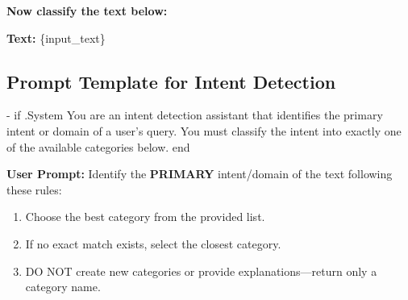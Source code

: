 \begin{tcolorbox}
\textbf{Now classify the text below:}  

\textbf{Text:} \{input\_text\}

\end{tcolorbox}


\subsection{ Prompt Template for Intent Detection}
\label{appendix_intent_detection}
\begin{tcolorbox}[
    colback=gray!5, colframe=black, coltitle=white, colbacktitle=gray!70, 
    fonttitle=\bfseries, title=Intent Detection Prompt Template, 
    boxrule=0.8pt, width=0.8\textwidth, sharp corners, boxsep=0.5mm, 
    left=0.5mm, right=0.5mm, top=0.5mm, bottom=0.5mm]
\scriptsize
{{- if .System }}You are an intent detection assistant that identifies the primary intent or domain of a user's query. You must classify the intent into exactly one of the available categories below.{{ end }}

\textbf{User Prompt:} Identify the \textbf{PRIMARY} intent/domain of the text following these rules:
\begin{enumerate}\itemsep0pt
    \item Choose the best category from the provided list.
    \item If no exact match exists, select the closest category.
    \item DO NOT create new categories or provide explanations—return only a category name.
\end{enumerate}


\end{tcolorbox}

